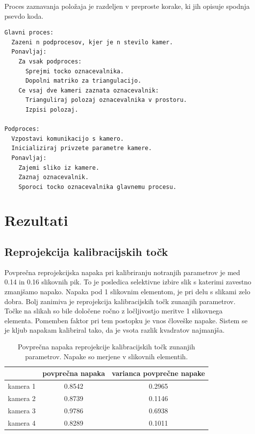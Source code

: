 \documentclass[a4paper, 12pt]{book}
\begin{document}
Proces zaznavanja položaja je razdeljen v preproste korake, ki jih opisuje spodnja psevdo koda.

\begin{lstlisting}
Glavni proces: 
  Zazeni n podprocesov, kjer je n stevilo kamer.
  Ponavljaj:
    Za vsak podproces:
      Sprejmi tocko oznacevalnika.
      Dopolni matriko za triangulacijo.
    Ce vsaj dve kameri zaznata oznacevalnik:
      Trianguliraj polozaj oznacevalnika v prostoru.
      Izpisi polozaj.

Podproces:
  Vzpostavi komunikacijo s kamero.
  Inicializiraj privzete parametre kamere.
  Ponavljaj:
    Zajemi sliko iz kamere.
    Zaznaj oznacevalnik.
    Sporoci tocko oznacevalnika glavnemu procesu.
\end{lstlisting}

\chapter{Rezultati}
\section{Reprojekcija kalibracijskih točk}

Povprečna reprojekcijska napaka pri kalibriranju notranjih parametrov je med 0.14 in 0.16 slikovnih pik. To je posledica selektivne izbire slik s katerimi zavestno zmanjšamo napako. Napaka pod 1 slikovnim elementom, je pri delu s slikami zelo dobra. Bolj zanimiva je reprojekcija kalibracijskih točk zunanjih parametrov. Točke na slikah so bile določene ročno z ločljivostjo meritve 1 slikovnega elementa. Pomemben faktor pri tem postopku je vnos človeške napake. Sistem se je kljub napakam kalibriral tako, da je vsota razlik kvadratov najmanjša. 

\begin{table}[H]
\centering
\begin{tabular}{| l | c | c |}
\hline
 & povprečna napaka & varianca povprečne napake \\
\hline
kamera 1 & 0.8542 & 0.2965 \\
kamera 2 & 0.8739 & 0.1146 \\
kamera 3 & 0.9786 & 0.6938 \\
kamera 4 & 0.8289 & 0.1011 \\
\hline
\end{tabular}
\caption{Povprečna napaka reprojekcije kalibracijskih točk zunanjih parametrov. Napake so merjene v slikovnih elementih.}
\label{pointpairs}
\end{table}
\end{document}
